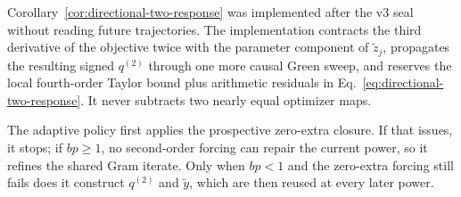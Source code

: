 \documentclass{article}
\begin{document}
Corollary~\ref{cor:directional-two-response} was implemented after the v3
seal without reading future trajectories.  The implementation contracts the
third derivative of the objective twice with the parameter component of
$\widetilde z_j$, propagates the resulting signed $q^{(2)}$ through one more
causal Green sweep, and reserves the local fourth-order Taylor bound plus
arithmetic residuals in Eq.~\eqref{eq:directional-two-response}.  It never
subtracts two nearly equal optimizer maps.

The adaptive policy first applies the prospective zero-extra closure.  If that
issues, it stops; if $bp\ge1$, no second-order forcing can repair the current
power, so it refines the shared Gram iterate.  Only when $bp<1$ and the
zero-extra forcing still fails does it construct $q^{(2)}$ and $\widetilde y$,
which are then reused at every later power.
\end{document}
